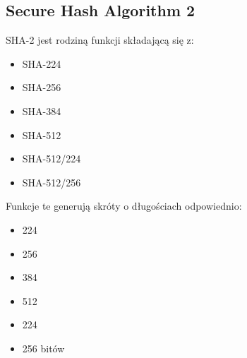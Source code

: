 \subsection{Secure Hash Algorithm 2}
SHA-2 jest rodziną funkcji składającą się z:
\begin{itemize}
	\item \mbox{SHA-224}
	\item \mbox{SHA-256}
	\item \mbox{SHA-384}
	\item \mbox{SHA-512}
	\item \mbox{SHA-512/224}
	\item \mbox{SHA-512/256} \\
\end{itemize} 
Funkcje te generują skróty o długościach odpowiednio: 
\begin{itemize}
	\item 224
	\item 256
	\item 384
	\item 512
	\item 224
	\item 256 bitów
\end{itemize} 


